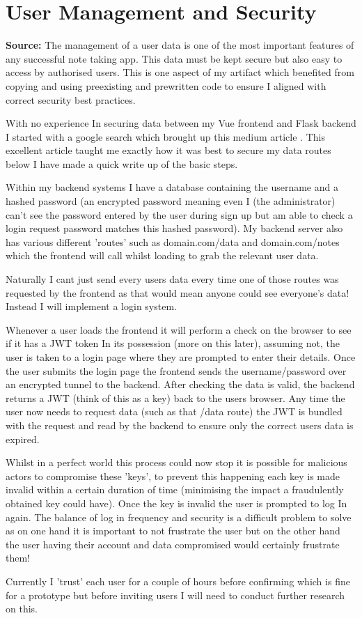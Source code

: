 \section{User Management and Security}
\label{research:UserManagementAndSecurity}
\textbf{Source:} \cite{reddyBuildingSecureLogin2025}
The management of a user data is one of the most important features of any successful note taking app. This data must be kept secure but also easy to access  by authorised users. This is one aspect of my artifact which benefited from copying and using preexisting and prewritten code to ensure I aligned with correct security best practices.

With no experience In securing data between my Vue frontend and Flask backend I started with a google search which brought up this medium article \cite{reddyBuildingSecureLogin2025}. This excellent article taught me exactly how it was best to secure my data routes below I have made a quick write up of the basic steps.

Within my backend systems I have a database containing the username and a hashed password (an encrypted password meaning even I (the administrator) can't see the password entered by the user during sign up but am able to check a login request password matches this hashed password). My backend server also has various different 'routes' such as domain.com/data and domain.com/notes which the frontend will call whilst loading to grab the relevant user data. 

Naturally I cant just send every users data every time one of those routes was requested by the frontend as that would mean anyone could see everyone's data! Instead I will implement a login system.

Whenever a user loads the frontend it will perform a check on the browser to see if it has a JWT token In its possession (more on this later), assuming not, the user is taken to a login page where they are prompted to enter their details. Once the user submits the login page the frontend sends the username/password over an encrypted tunnel to the backend. After checking the data is valid, the backend returns a JWT (think of this as a key) back to the users browser. Any time the user now needs to request data (such as that /data route) the JWT is bundled with the request and read by the backend to ensure only the correct users data is expired. 

Whilst in a perfect world this process could now stop it is possible for malicious actors to compromise these 'keys', to prevent this happening each key is made invalid within a certain duration of time (minimising the impact a fraudulently obtained key could have). Once the key is invalid the user is prompted to log In again. The balance of log in frequency and security is a difficult problem to solve as on one hand it is important to not frustrate the user but on the other hand the user having their account and data compromised would certainly frustrate them! 

Currently I 'trust' each user for a couple of hours before confirming which is fine for a prototype but before inviting users I will need to conduct further research on this. 
